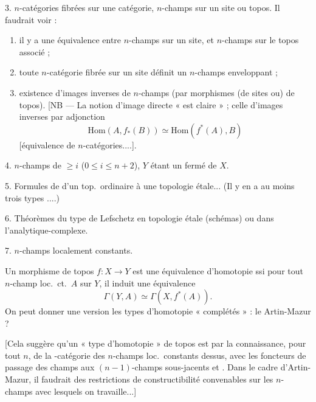\documentclass[11pt,a4paper]{article}
\begin{document}
3. $n$-catégories fibrées sur une catégorie, $n$-champs sur un site ou
topos.  Il faudrait voir :

\begin{enumerate}
\item il y a une équivalence entre $n$-champs sur un
site, et $n$-champs sur le topos associé ;
\item toute $n$-catégorie fibrée sur un site définit un $n$-champs
enveloppant ;
\item existence d'images inverses de $n$-champs (par morphismes (de sites
ou) de topos). [NB — La notion d'image directe « est claire » ; celle
d'images inverses  par adjonction
\[
\mathrm{Hom}(A, f_{*}(B)) \simeq \mathrm{Hom}(f^{*}(A), B)
\]
{[}équivalence de $n$-catégories....].
\end{enumerate}

4. \struck{\ill} $n$-champs de  
$\geq i$ ($0 \leq i \leq n+2$), $Y$ étant un fermé de $X$.

5. Formules de  d'un top.\ ordinaire à
 une topologie étale... (Il y en a au moins trois
\struck{\ill} types ....)

6. \struck{\ill} Théorèmes du type de Lefschetz en topologie étale
(schémas) ou dans l'analytique-complexe.

7. $n$-champs localement constants.

Un morphisme de topos $f : X \to Y$ est une équivalence d'homotopie ssi pour
tout $n$-champ loc.\ ct.\ $A$ sur $Y$, il induit une équivalence
\[
\Gamma(Y, A) \simeq \Gamma(X, f^{*}(A)).
\]
On peut donner une version  les types d'homotopie
« complétés »  : le Artin-Mazur ?

[Cela suggère qu'un « type d'homotopie » de topos est 
par la connaissance, pour tout $n$, de la -catégorie des
$n$-champs loc.\ constants dessus, avec les foncteurs de passage des
\struck{\ill}champs aux $(n{-}1)$-champs sous-jacents et
. Dans le cadre d'Artin-Mazur, il faudrait des
restrictions de constructibilité convenables sur les $n$-champs avec
lesquels on travaille...]
\end{document}
